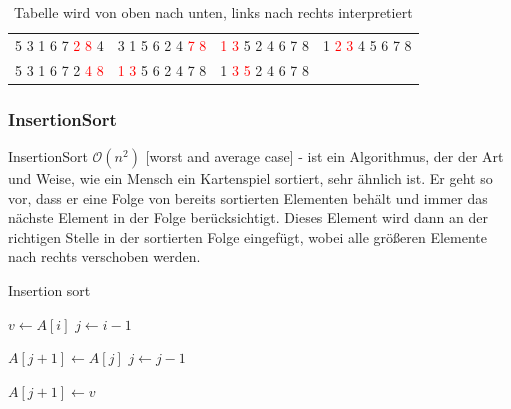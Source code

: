 \documentclass[a4paper]{article}
\begin{document}
\begin{table}[h]
\begin{tabular}{c|c|c|c}
            5 3 1 6 7  \textcolor{red}{2 8} 4 &
            3 1 5 6 2 4  \textcolor{red}{7 8} &
             \textcolor{red}{1 3} 5 2 4 6 7 8 &
            1  \textcolor{red}{2 3} 4 5 6 7 8 \\

            5 3 1 6 7 2 \textcolor{red}{4 8} & 
          \textcolor{red}{1 3} 5 6 2 4 7 8 &
            1 \textcolor{red}{3 5} 2 4 6 7 8 &
            \\
       
        \end{tabular}
        \caption{Tabelle wird von oben nach unten, links nach rechts interpretiert}
        \label{tab:BubblesortTable}
    \end{table}
\newpage
 \subsubsection{InsertionSort}\label{Insertionsort}
    InsertionSort $\mathcal{O}(n^2)$ [worst and average case] - ist ein Algorithmus, der der Art und Weise, wie ein Mensch ein Kartenspiel sortiert, sehr ähnlich ist. Er geht so vor, dass er eine Folge von bereits sortierten Elementen behält und immer das nächste Element in der Folge berücksichtigt. Dieses Element wird dann an der richtigen Stelle in der sortierten Folge eingefügt, wobei alle größeren Elemente nach rechts verschoben werden.

\begin{algorithm}
    \caption{Insertion sort}
    \label{alg:InsertionSort}
    \begin{algorithmic} 
        \State $v \gets A\left[i\right]$
        \State $j \gets i-1$
        
        \State $A\left[j+1\right] \gets A\left[j\right]$
        \State $j\leftarrow j-1$
        \EndWhile
        
        \State $A\left[j+1\right] \gets v$
        \EndFor
    \end{algorithmic}
\end{algorithm}
\end{document}

